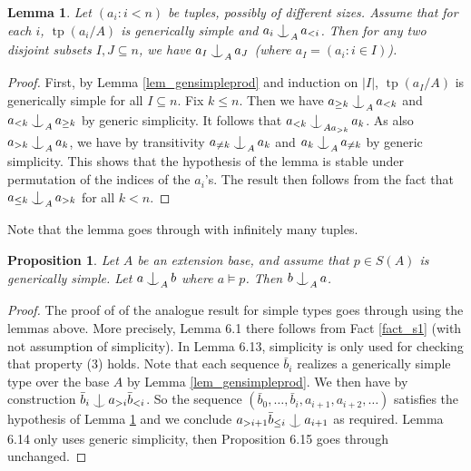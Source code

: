 \documentclass{amsart}
\makeatletter
\numberwithin{equation}{section}
\newtheorem{prop}[thm]{Proposition}
\newtheorem{lemme}[thm]{Lemma}
\theoremstyle{definition}
\theoremstyle{mystyle}
\theoremstyle{remark}
\DeclareMathOperator{\tp}{tp}
\def\indsym#1#2{%
 \setbox0=\hbox{$\m@th#1x$}%
 \kern\wd0%
 \hbox to 0pt{\hss$\m@th#1\mid$\hbox to 0pt{$\m@th#1^{#2}$\hss}\hss}%
 \lower.9\ht0\hbox to 0pt{\hss$\m@th#1\smile$\hss}%
 \kern\wd0}
\newcommand{\ind}[1][]{\mathop{\mathpalette\indsym{#1}}}
\makeatother
\begin{document}
\begin{lemme}\label{lem_symgensimple}
Let $(a_i:i<n)$ be tuples, possibly of different sizes. Assume that for each $i$, $\tp(a_i/A)$ is generically simple and $a_i\ind_A a_{<i}$. Then for any two disjoint subsets $I,J\subseteq n$, we have $a_I \ind_A a_J$ (where $a_I=(a_i:i\in I)$).
\end{lemme}
\begin{proof}
First, by Lemma \ref{lem_gensimpleprod} and induction on $|I|$, $\tp(a_I/A)$ is generically simple for all $I\subseteq n$. Fix $k\leq n$. Then we have $a_{\geq k}\ind_A a_{<k}$ and $a_{<k}\ind_A a_{\geq k}$ by generic simplicity. It follows that $a_{<k}\ind_{Aa_{>k}} a_k$. As also $a_{>k}\ind_A a_k$, we have by transitivity $a_{\neq k}\ind_A a_k$ and $a_k \ind_A a_{\neq k}$ by generic simplicity. This shows that the hypothesis of the lemma is stable under permutation of the indices of the $a_i$'s. The result then follows from the fact that $a_{\leq k}\ind_A a_{>k}$ for all $k<n$.
\end{proof}

Note that the lemma goes through with infinitely many tuples.


\begin{prop}
Let $A$ be an extension base, and assume that $p\in S(A)$ is generically simple. Let $a \ind_A b$ where $a\models p$. Then $b\ind_A a$.
\end{prop}
\begin{proof}
The proof of \cite[Section 6.2]{CherNTP} of the analogue result for simple types goes through using the lemmas above. More precisely, Lemma 6.1 there follows from Fact \ref{fact_s1} (with not assumption of simplicity). In Lemma 6.13, simplicity is only used for checking that property (3) holds. Note that each sequence $\bar b_i$ realizes a generically simple type over the base $A$ by Lemma \ref{lem_gensimpleprod}. We then have by construction $\bar b_i \ind a_{>i}\bar b_{<i}$. So the sequence $(\bar b_0,\ldots,\bar b_i,a_{i+1},a_{i+2},\ldots)$ satisfies the hypothesis of Lemma \ref{lem_symgensimple} and we conclude $a_{>i+1}\bar b_{\leq i} \ind a_{i+1}$ as required. Lemma 6.14 only uses generic simplicity, then Proposition 6.15 goes through unchanged.
\end{proof}
\end{document}
